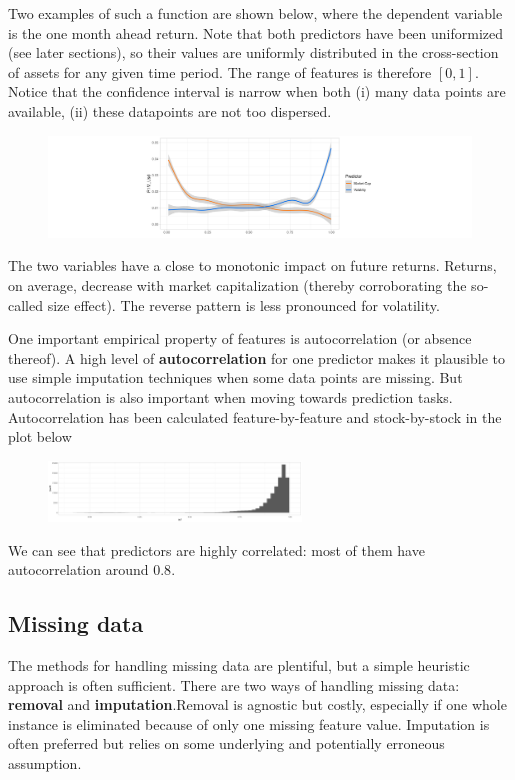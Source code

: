 Two examples of such a function are shown below, where the dependent variable is the one month ahead return. Note that both predictors have been uniformized (see later sections), so their values are uniformly distributed in the cross-section of assets for any given time period. The range of features is therefore $[0,1]$. Notice that the confidence interval is narrow when both (i) many data points are available, (ii) these datapoints are not too dispersed.
\begin{figure}[H]
    \centering
    \includegraphics[width=\textwidth]{part_1/images/know_your_data_fig_2:sca.png}
\end{figure}
The two variables have a close to monotonic impact on future returns. Returns, on average, decrease with market capitalization (thereby corroborating the so-called size effect). The reverse pattern is less pronounced for volatility.


One important empirical property of features is autocorrelation (or absence thereof). A high level of \textbf{autocorrelation} for one predictor makes it plausible to use simple imputation techniques when some data points are missing. But autocorrelation is also important when moving towards prediction tasks. Autocorrelation has been calculated feature-by-feature and stock-by-stock in the plot below 
\begin{figure}[H]
    \centering
    \includegraphics[width=0.6\textwidth]{part_1/images/know_your_data_fig_3:autocorr.png}
\end{figure}


We can see that predictors are highly correlated: most of them have autocorrelation around $0.8$.

\subsection{Missing data}
The methods for handling missing data are plentiful, but a simple heuristic approach is often sufficient. There are two ways of handling missing data: \textbf{removal} and \textbf{imputation}.Removal is agnostic but costly, especially if one whole instance is eliminated because of only one missing feature value. Imputation is often preferred but relies on some underlying and potentially erroneous assumption. 

